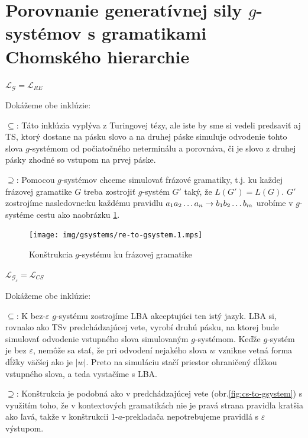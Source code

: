 \section{Porovnanie generatívnej sily $g$-systémov s gramatikami Chomského hierarchie}

\begin{veta}
\label{gs_veta_gre} $\mathcal{L}_{\mathcal{G}}=\mathcal{L}_{RE}$
\end{veta}

\begin{dokaz}
Dokážeme obe inklúzie:
\begin{description}
\item{$\subseteq$:} Táto inklúzia vyplýva z Turingovej tézy, ale
iste by sme si vedeli predsaviť aj TS, ktorý dostane na pásku
slovo a na druhej páske simuluje odvodenie tohto slova
$g$-systémom od počiatočného neterminálu a porovnáva, či je slovo
z druhej pásky zhodné so vstupom na prvej páske.
\item{$\supseteq$:} Pomocou $g$-systémov chceme simulovať frázové gramatiky, t.j. ku každej
frázovej gramatike $G$ treba zostrojiť $g$-systém $G'$ taký, že
$L(G')=L(G)$. $G'$ zostrojíme nasledovne:\newline ku každému
pravidlu $a_1a_2\dots a_n\rightarrow b_1b_2\dots b_m$ urobíme v
$g$-systéme cestu ako na\linebreak obrázku \ref{fig:re-to-gsystem}.
\end{description}
\end{dokaz}

\begin{figure}[!ht]
    \centering
    \texttt{[image: img/gsystems/re-to-gsystem.1.mps]}
    \caption{Konštrukcia $g$-systému ku frázovej gramatike}
    \label{fig:re-to-gsystem}
\end{figure}

\pagebreak

\begin{veta}
\label{gs_veta_gre2}
$\mathcal{L}_{\mathcal{G}_\varepsilon}=\mathcal{L}_{CS}$
\end{veta}

\begin{dokaz}
Dokážeme obe inklúzie:
\begin{description}
\item{$\subseteq$:} K bez-$\varepsilon$ $g$-systému zostrojíme LBA
akceptujúci ten istý jazyk. LBA si, rovnako ako TS\linebreak v
predchádzajúcej vete, vyrobí druhú pásku, na ktorej bude simulovať
odvodenie vstupného slova simulovaným $g$-systémom. Keďže
$g$-systém je bez $\varepsilon$, nemôže sa stať, že pri odvodení
nejakého slova $w$ vznikne vetná forma dĺžky väčšej ako je $|w|$.
Preto na simuláciu stačí priestor ohraničený dĺžkou vstupného
slova, a teda vystačíme s LBA.
\item{$\supseteq$:} Konštrukcia je podobná ako v predchádzajúcej vete
(obr.\ref{fig:cs-to-gsystem}) s využitím toho, že v kontextových gramatikách nie
je pravá strana pravidla kratšia ako ľavá, takže v konštrukcii
1-$a$-prekladača nepotrebujeme pravidlá s $\varepsilon$ výstupom.
\end{description}
\end{dokaz}

